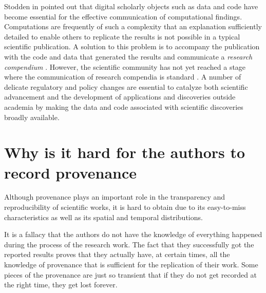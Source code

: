 Stodden in \cite{stodden2014enabling} pointed out that digital scholarly objects such as data and code have become essential for the effective communication of computational findings. Computations are frequently of such a complexity that an explanation sufficiently detailed to enable others to replicate the results is not possible in a typical scientific publication. A solution to this problem is to accompany the publication with the code and data that generated the results and communicate a \emph{research compendium} \cite{gentleman2007statistical}. However, the scientific community has not yet reached a stage where the communication of research compendia is standard \cite{donoho2009reproducible}. A number of delicate regulatory and policy changes are essential to catalyze both scientific advancement and the development of applications and discoveries outside academia by making the data and code associated with scientific discoveries broadly available.


\section{Why is it hard for the authors to record provenance}
Although provenance plays an important role in the transparency and reproducibility of scientific 
works, it is hard to obtain due to its easy-to-miss characteristics as well as its spatial and temporal distributions.

It is a fallacy that the authors do not have the knowledge of everything happened during the process 
of the research work. The fact that they successfully got the reported results proves that they 
actually have, at certain times, all the knowledge of provenance that is sufficient for the 
replication of their work. Some pieces of the provenance are just so transient that if they do not 
get recorded at the right time, they get lost forever.


